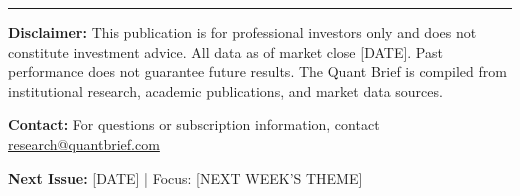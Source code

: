 \documentclass[11pt,a4paper]{article}
\begin{document}
\vspace{1cm}

\begin{center}
\color{mediumgray}
\rule{0.5\textwidth}{0.4pt}
\end{center}

\vspace{0.5cm}

{\footnotesize
\textbf{Disclaimer:} This publication is for professional investors only and does not constitute investment advice. All data as of market close [DATE]. Past performance does not guarantee future results. The Quant Brief is compiled from institutional research, academic publications, and market data sources.

\textbf{Contact:} For questions or subscription information, contact \href{mailto:research@quantbrief.com}{research@quantbrief.com}

\textbf{Next Issue:} [DATE] | Focus: [NEXT WEEK'S THEME]
}
\end{document}
